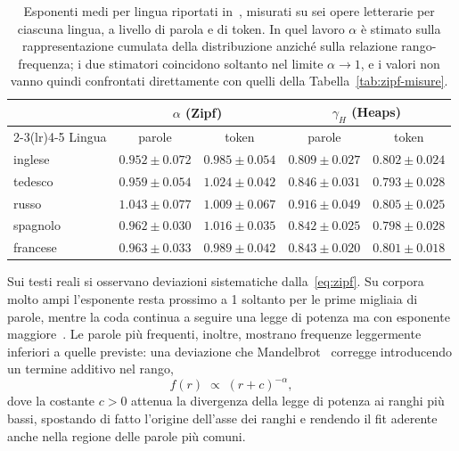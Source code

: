 \begin{table}[htbp]
\centering
\small
\begin{tabular}{@{}lcccc@{}}
\toprule
& \multicolumn{2}{c}{$\alpha$ (Zipf)} & \multicolumn{2}{c}{$\gamma_H$ (Heaps)} \\
\cmidrule(lr){2-3}\cmidrule(lr){4-5}
Lingua & parole & token & parole & token \\
\midrule
inglese  & $0.952 \pm 0.072$ & $0.985 \pm 0.054$ & $0.809 \pm 0.027$ & $0.802 \pm 0.024$ \\
tedesco  & $0.959 \pm 0.054$ & $1.024 \pm 0.042$ & $0.846 \pm 0.031$ & $0.793 \pm 0.028$ \\
russo    & $1.043 \pm 0.077$ & $1.009 \pm 0.067$ & $0.916 \pm 0.049$ & $0.805 \pm 0.025$ \\
spagnolo & $0.962 \pm 0.030$ & $1.016 \pm 0.035$ & $0.842 \pm 0.025$ & $0.798 \pm 0.028$ \\
francese & $0.963 \pm 0.033$ & $0.989 \pm 0.042$ & $0.843 \pm 0.020$ & $0.801 \pm 0.018$ \\
\bottomrule
\end{tabular}
\caption{Esponenti medi per lingua riportati in~\cite{mikhaylovskiy2025zipf},
misurati su sei opere letterarie per ciascuna lingua, a livello di parola e di
token. In quel lavoro $\alpha$ è stimato sulla rappresentazione
cumulata della distribuzione anziché sulla relazione rango-frequenza; i due
stimatori coincidono soltanto nel limite $\alpha \to 1$, e i valori non vanno
quindi confrontati direttamente con quelli della
Tabella~\ref{tab:zipf-misure}.}
\label{tab:zipf-letteratura}
\end{table}

Sui testi reali si osservano deviazioni sistematiche dalla~\eqref{eq:zipf}. Su
corpora molto ampi l'esponente resta prossimo a 1 soltanto per le prime migliaia
di parole, mentre la coda continua a seguire una legge di potenza ma con
esponente maggiore~\cite{piantadosi2014}. Le parole più frequenti, inoltre,
mostrano frequenze leggermente inferiori a quelle previste: una deviazione che
Mandelbrot~\cite{mandelbrot1953} corregge introducendo un termine additivo nel
rango,
\begin{equation}
  f(r) \;\propto\; (r + c)^{-\alpha},
  \label{eq:mandelbrot}
\end{equation}
dove la costante $c > 0$ attenua la divergenza della legge di potenza ai ranghi
più bassi, spostando di fatto l'origine dell'asse dei ranghi e rendendo il fit
aderente anche nella regione delle parole più comuni.

